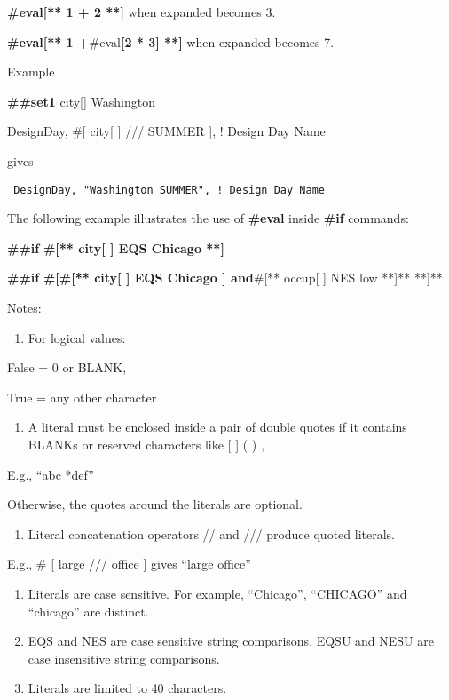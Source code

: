 \textbf{\#eval{[}** 1 + 2 **{]}} when expanded becomes 3.

\textbf{\#eval{[}** 1 +}\#eval\textbf{{[}2 * 3{]} **{]}} when expanded becomes 7.

Example

\textbf{\#\#set1} city{[}{]} Washington

DesignDay, \#{[} city{[} {]} /// SUMMER {]}, ! Design Day Name

gives

\begin{lstlisting}
 DesignDay, "Washington SUMMER", ! Design Day Name
\end{lstlisting}

The following example illustrates the use of \textbf{\#eval} inside \textbf{\#if} commands:

\textbf{\#\#if} \textbf{\#{[}** city{[} {]} EQS Chicago **{]}}

\textbf{\#\#if} \textbf{\#{[}\#{[}** city{[} {]} EQS Chicago {]} and}\#{[}** occup{[} {]} NES low **{]}** **{]}**

Notes:

\begin{enumerate}
\def\labelenumi{\arabic{enumi}.}
\tightlist
\item
  For logical values:
\end{enumerate}

False = 0 or BLANK,

True = any other character

\begin{enumerate}
\def\labelenumi{\arabic{enumi}.}
\setcounter{enumi}{1}
\tightlist
\item
  A literal must be enclosed inside a pair of double quotes if it contains BLANKs or reserved characters like {[} {]} ( ) ,
\end{enumerate}

E.g., ``abc *def''

Otherwise, the quotes around the literals are optional.

\begin{enumerate}
\def\labelenumi{\arabic{enumi}.}
\setcounter{enumi}{2}
\tightlist
\item
  Literal concatenation operators // and /// produce quoted literals.
\end{enumerate}

E.g., \# {[} large /// office {]} gives ``large office''

\begin{enumerate}
\def\labelenumi{\arabic{enumi}.}
\setcounter{enumi}{3}
\item
  Literals are case sensitive. For example, ``Chicago'', ``CHICAGO'' and ``chicago'' are distinct.
\item
  EQS and NES are case sensitive string comparisons. EQSU and NESU are case insensitive string comparisons.
\item
  Literals are limited to 40 characters.
\end{enumerate}
